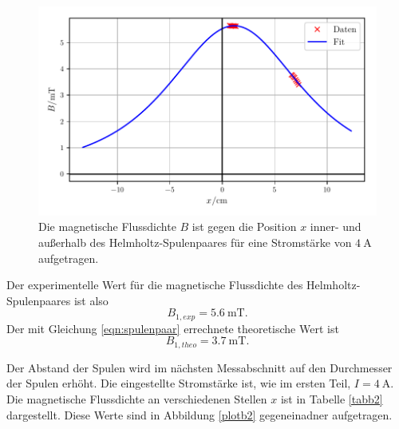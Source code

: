 \begin{figure}
    \centering
    \includegraphics{build/plotb1.pdf}
    \caption{Die magnetische Flussdichte $B$ ist gegen die Position $x$ inner-
    und außerhalb des Helmholtz-Spulenpaares für eine Stromstärke von
    $\SI{4}{\ampere}$ aufgetragen.}
    \label{plotb1}
\end{figure}

\noindent Der experimentelle Wert für die magnetische Flussdichte
des Helmholtz-Spulenpaares ist also
\begin{equation*}
   B_{1,exp} = \SI{5.6}{\milli\tesla}.
\end{equation*}
Der mit Gleichung \eqref{eqn:spulenpaar} errechnete theoretische
Wert ist 
\begin{equation*}
   B_{1,theo} = \SI{3.7}{\milli\tesla}.
\end{equation*}

\noindent Der Abstand der Spulen wird im nächsten Messabschnitt auf den
Durchmesser der Spulen erhöht.
Die eingestellte Stromstärke ist, wie im ersten Teil,
$I = \SI{4}{\ampere}$.
Die magnetische Flussdichte an verschiedenen Stellen $x$ ist
in Tabelle \ref{tabb2} dargestellt.
Diese Werte sind in Abbildung \ref{plotb2} gegeneinadner
aufgetragen.


